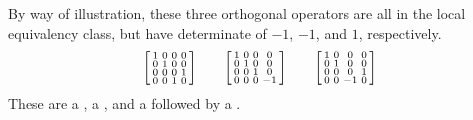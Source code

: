 By way of illustration, these three orthogonal operators are all in the  local equivalency class, but have determinate of $-1$, $-1$, and $1$, respectively.
\[
\begin{bsmallmatrix}
 1& 0 & 0 & 0 \\
  0 & 1 & 0 & 0 \\
  0 & 0 & 0 & 1 \\
  0 & 0 & 1 & 0 
\end{bsmallmatrix}
\qquad
\begin{bsmallmatrix}
 1& 0 & 0 & 0 \\
  0 & 1 & 0 & 0 \\
  0 & 0 & 1 & 0 \\
  0 & 0 & 0 & -1 
\end{bsmallmatrix}
\qquad
\begin{bsmallmatrix}
 1& 0 & 0 & 0 \\
  0 & 1 & 0 & 0 \\
  0 & 0 & 0 & 1 \\
  0 & 0 & -1 & 0 
\end{bsmallmatrix}
\notag
\]
These are a , a , and a  followed by a .






%





